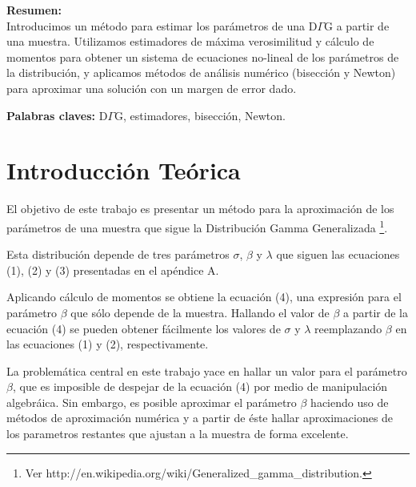 \documentclass[a4paper,10pt,twoside]{article}
\begin{document}
\textbf{Resumen:} \\
Introducimos un método para estimar los parámetros de una D$\Gamma$G a partir de una muestra.
Utilizamos estimadores de máxima verosimilitud y cálculo de momentos para obtener un sistema
de ecuaciones no-lineal de los parámetros de la distribución, y aplicamos métodos de análisis
numérico (bisección y Newton) para aproximar una solución con un margen de error dado.

\textbf{Palabras claves:} D$\Gamma$G, estimadores, bisección, Newton.

\vspace{6cm}

\newpage




\tableofcontents

\newpage




\section{Introducción Teórica}

El objetivo de este trabajo es presentar un método para la aproximación de los
parámetros de una muestra que sigue la Distribución Gamma Generalizada
\footnote{Ver http://en.wikipedia.org/wiki/Generalized\_gamma\_distribution.}.

Esta distribución depende de tres parámetros $\sigma$, $\beta$ y $\lambda$ que siguen
las ecuaciones (1), (2) y (3) presentadas en el apéndice A.

Aplicando cálculo de momentos se obtiene la ecuación (4), una expresión para
el parámetro $\beta$ que sólo depende de la muestra. Hallando el valor de $\beta$
a partir de la ecuación (4) se pueden obtener fácilmente los valores de $\sigma$
y $\lambda$ reemplazando $\beta$ en las ecuaciones (1) y (2), respectivamente.

La problemática central en este trabajo yace en hallar un valor para el
parámetro $\beta$, que es imposible de despejar de la ecuación (4) por medio de
manipulación algebráica. Sin embargo, es posible aproximar el parámetro $\beta$
haciendo uso de métodos de aproximación numérica y a partir de éste hallar
aproximaciones de los parametros restantes que ajustan a la muestra de forma
excelente.
\end{document}

